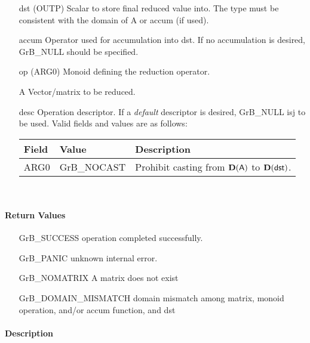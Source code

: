 \begin{itemize}[leftmargin=1.1in]
    \item[{\sf dst}]    ({\sf OUTP}) Scalar to store final reduced value into.  The type must be
                        consistent with the domain of {\sf A} or {\sf accum} (if used).

    \item[{\sf accum}]  Operator used for accumulation into {\sf dst}.  If no accumulation
                        is desired, {\sf GrB\_NULL} should be specified.

    \item[{\sf op}]     ({\sf ARG0}) Monoid defining the reduction operator.
    \item[{\sf A}]    Vector/matrix to be reduced.

    \item[{\sf desc}]   Operation descriptor. If a
    \emph{default} descriptor is desired, {\sf GrB\_NULL} isj to be
    used.  Valid fields and values are as follows: \\
    \begin{tabular}{lll}
    Field  & Value & Description \\
    \hline
    {\sf ARG0} & {\sf GrB\_NOCAST} & Prohibit casting from $\bold{D}({\sf A})$ to 
    $\bold{D}({\sf dst})$.  \\
    \end{tabular}\\
\end{itemize}

\paragraph{Return Values}

\begin{itemize}[leftmargin=2.1in]
\item[{\sf GrB\_SUCCESS}]             operation completed successfully.
\item[{\sf GrB\_PANIC}]               unknown internal error.
\item[{\sf GrB\_NOMATRIX}]   {\sf A} matrix does not exist
\item[{\sf GrB\_DOMAIN\_MISMATCH}]  
        domain mismatch among matrix, monoid operation, and/or
        accum function, and {\sf dst} 
\end{itemize}

\paragraph{Description}

